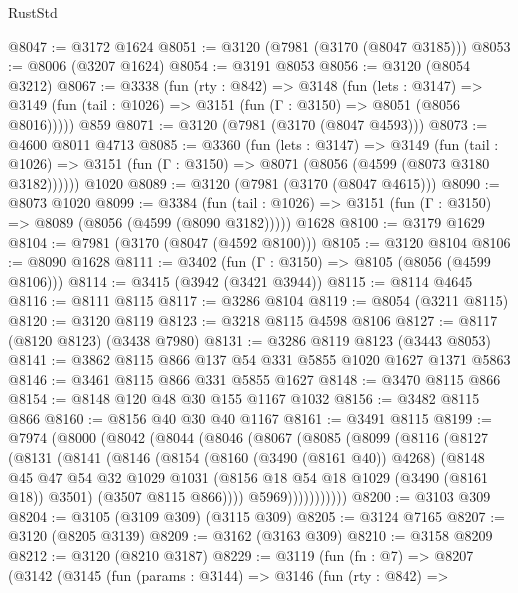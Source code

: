 \begin{lexlean}{RustStd}
\begin{coremodule}
{\begin{coremodule}
{{{{{{{{{{{{{{{{{{{{{{{{{{@8047 := @3172 @1624
@8051 := @3120 (@7981 (@3170 (@8047 @3185)))
@8053 := @8006 (@3207 @1624)
@8054 := @3191 @8053
@8056 := @3120 (@8054 @3212)
@8067 := @3338
    (fun (rty : @842) =>
    @3148
      (fun (lets : @3147) =>
      @3149 (fun (tail : @1026) => @3151 (fun (Γ : @3150) => @8051 (@8056 @8016)))))
    @859
@8071 := @3120 (@7981 (@3170 (@8047 @4593)))
@8073 := @4600 @8011 @4713
@8085 := @3360
    (fun (lets : @3147) =>
    @3149
      (fun (tail : @1026) => @3151 (fun (Γ : @3150) => @8071 (@8056 (@4599 (@8073 @3180 @3182))))))
    @1020
@8089 := @3120 (@7981 (@3170 (@8047 @4615)))
@8090 := @8073 @1020
@8099 := @3384
    (fun (tail : @1026) => @3151 (fun (Γ : @3150) => @8089 (@8056 (@4599 (@8090 @3182)))))
    @1628
@8100 := @3179 @1629
@8104 := @7981 (@3170 (@8047 (@4592 @8100)))
@8105 := @3120 @8104
@8106 := @8090 @1628
@8111 := @3402 (fun (Γ : @3150) => @8105 (@8056 (@4599 @8106)))
@8114 := @3415 (@3942 (@3421 @3944))
@8115 := @8114 @4645
@8116 := @8111 @8115
@8117 := @3286 @8104
@8119 := @8054 (@3211 @8115)
@8120 := @3120 @8119
@8123 := @3218 @8115 @4598 @8106
@8127 := @8117 (@8120 @8123) (@3438 @7980)
@8131 := @3286 @8119 @8123 (@3443 @8053)
@8141 := @3862 @8115 @866 @137 @54 @331 @5855 @1020 @1627 @1371 @5863
@8146 := @3461 @8115 @866 @331 @5855 @1627
@8148 := @3470 @8115 @866
@8154 := @8148 @120 @48 @30 @155 @1167 @1032
@8156 := @3482 @8115 @866
@8160 := @8156 @40 @30 @40 @1167
@8161 := @3491 @8115
@8199 := @7974
    (@8000
      (@8042
        (@8044
          (@8046
            (@8067
              (@8085
                (@8099
                  (@8116
                    (@8127
                      (@8131
                        (@8141
                          (@8146
                            (@8154
                              (@8160 (@3490 (@8161 @40)) @4268)
                              (@8148
                                @45
                                @47
                                @54
                                @32
                                @1029
                                @1031
                                (@8156 @18 @54 @18 @1029 (@3490 (@8161 @18)) @3501)
                                (@3507 @8115 @866))))
                          @5969)))))))))))
@8200 := @3103 @309
@8204 := @3105 (@3109 @309) (@3115 @309)
@8205 := @3124 @7165
@8207 := @3120 (@8205 @3139)
@8209 := @3162 (@3163 @309)
@8210 := @3158 @8209
@8212 := @3120 (@8210 @3187)
@8229 := @3119
    (fun (fn : @7) =>
    @8207
      (@3142
        (@3145
          (fun (params : @3144) =>
          @3146
            (fun (rty : @842) =>
}}}}}}}}}}}}}}}}}}}}}}}}}}
\end{coremodule}}
\end{coremodule}
\end{lexlean}
